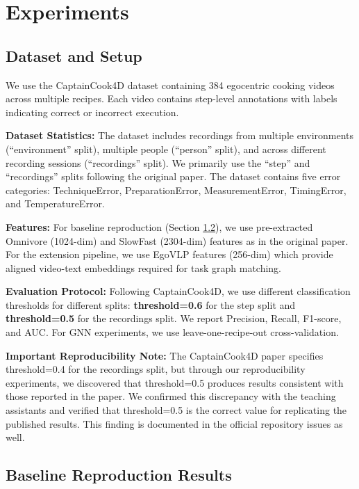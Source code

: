 \documentclass[10pt,twocolumn,letterpaper]{article}
\begin{document}
\section{Experiments}

\subsection{Dataset and Setup}

We use the CaptainCook4D dataset \cite{peddi2024captaincook4d} containing 384 egocentric cooking videos across multiple recipes. Each video contains step-level annotations with labels indicating correct or incorrect execution.

\textbf{Dataset Statistics:} The dataset includes recordings from multiple environments (``environment'' split), multiple people (``person'' split), and across different recording sessions (``recordings'' split). We primarily use the ``step'' and ``recordings'' splits following the original paper. The dataset contains five error categories: TechniqueError, PreparationError, MeasurementError, TimingError, and TemperatureError.

\textbf{Features:} For baseline reproduction (Section \ref{sec:baseline_reproduction}), we use pre-extracted Omnivore (1024-dim) and SlowFast (2304-dim) features as in the original paper. For the extension pipeline, we use EgoVLP features (256-dim) which provide aligned video-text embeddings required for task graph matching.

\textbf{Evaluation Protocol:} Following CaptainCook4D, we use different classification thresholds for different splits: \textbf{threshold=0.6} for the step split and \textbf{threshold=0.5} for the recordings split. We report Precision, Recall, F1-score, and AUC. For GNN experiments, we use leave-one-recipe-out cross-validation.

\textbf{Important Reproducibility Note:} The CaptainCook4D paper \cite{peddi2024captaincook4d} specifies threshold=0.4 for the recordings split, but through our reproducibility experiments, we discovered that threshold=0.5 produces results consistent with those reported in the paper. We confirmed this discrepancy with the teaching assistants and verified that threshold=0.5 is the correct value for replicating the published results. This finding is documented in the official repository issues as well.

\subsection{Baseline Reproduction Results}
\label{sec:baseline_reproduction}
\end{document}
